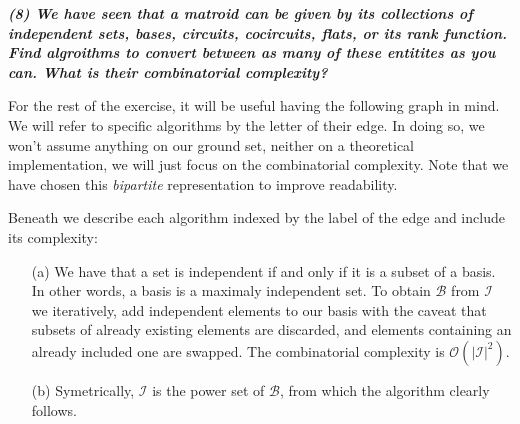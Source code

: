 \textbf{\textit{(8) We have seen that a matroid can be given by its collections of independent sets, bases, circuits, cocircuits, flats, or its rank function. Find algroithms to convert between as many of these entitites as you can. What is their combinatorial complexity?}}

\vspace{3pt}

For the rest of the exercise, it will be useful having the following graph in mind.
We will refer to specific algorithms by the letter of their edge.
In doing so, we won't assume anything on our ground set, neither on a theoretical implementation, we will just focus on the combinatorial complexity.
Note that we have chosen this \textit{bipartite} representation to improve readability.

\begin{center}
\end{center}

Beneath we describe each algorithm indexed by the label of the edge and include its complexity:
\begin{itemize}
    \item[(a)] 
        We have that a set is independent if and only if it is a subset of a basis.
        In other words, a basis is a maximaly independent set.
        To obtain $\mathcal{B}$ from $\mathcal{I}$ we iteratively, add independent elements to our basis with the caveat that subsets of already existing elements are discarded, and elements containing an already included one are swapped.
        The combinatorial complexity is $\mathcal{O}(|\mathcal{I}|^2)$.
    \item[(b)] Symetrically, $\mathcal{I}$ is the power set of $\mathcal{B}$, from which the algorithm clearly follows.
\end{itemize}
